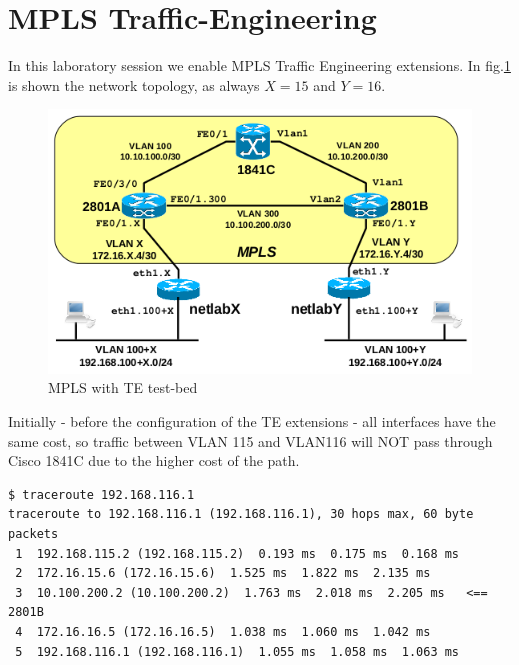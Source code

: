 \documentclass{llncs}
\newcommand{\labelsec}[1]{\label{sec:#1}}
\begin{document}
\newpage
\section{MPLS Traffic-Engineering}
\labelsec{MPLS_te}

In this laboratory session we enable MPLS Traffic Engineering extensions. In fig.\ref{fig:mpls3_topology} is shown the network topology, as always $X=15$ and $Y=16$. 

\begin{figure}
\centering
\includegraphics[width=1.0\textwidth]{../e5/topology.png}
\caption{MPLS with TE test-bed}
\label{fig:mpls3_topology}
\end{figure}


Initially - before the configuration of the TE extensions - all interfaces have the same cost, so traffic between VLAN 115 and VLAN116 will NOT pass through Cisco 1841C due to the higher cost of the path.\\

\lstset{language=sh, caption=Traceroute from a host in VLAN115., basicstyle=\ttfamily\scriptsize , breaklines=true}
\begin{lstlisting}
$ traceroute 192.168.116.1
traceroute to 192.168.116.1 (192.168.116.1), 30 hops max, 60 byte packets
 1  192.168.115.2 (192.168.115.2)  0.193 ms  0.175 ms  0.168 ms
 2  172.16.15.6 (172.16.15.6)  1.525 ms  1.822 ms  2.135 ms
 3  10.100.200.2 (10.100.200.2)  1.763 ms  2.018 ms  2.205 ms   <== 2801B
 4  172.16.16.5 (172.16.16.5)  1.038 ms  1.060 ms  1.042 ms
 5  192.168.116.1 (192.168.116.1)  1.055 ms  1.058 ms  1.063 ms
\end{lstlisting}
\end{document}
